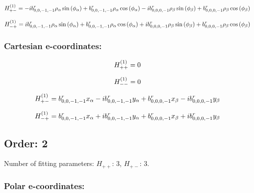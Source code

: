 \documentclass[fleqn]{article}
\begin{document}
\begin{dmath*}
H_{+-}^{(1)}=-  i b^{r}_{0,0,-1,-1} \rho_{\alpha} \sin{\left (\phi_{\alpha} \right )} + b^{r}_{0,0,-1,-1} \rho_{\alpha} \cos{\left (\phi_{\alpha} \right )} -  i b^{r}_{0,0,0,-1} \rho_{\beta} \sin{\left (\phi_{\beta} \right )} + b^{r}_{0,0,0,-1} \rho_{\beta} \cos{\left (\phi_{\beta} \right )}\\
\end{dmath*}

\begin{dmath*}
H_{-+}^{(1)}= i b^{r}_{0,0,-1,-1} \rho_{\alpha} \sin{\left (\phi_{\alpha} \right )} + b^{r}_{0,0,-1,-1} \rho_{\alpha} \cos{\left (\phi_{\alpha} \right )} +  i b^{r}_{0,0,0,-1} \rho_{\beta} \sin{\left (\phi_{\beta} \right )} + b^{r}_{0,0,0,-1} \rho_{\beta} \cos{\left (\phi_{\beta} \right )}\\
\end{dmath*}
\subsubsection*{Cartesian e-coordinates:}

\begin{dmath*}
H_{++}^{(1)}=0\\
\end{dmath*}

\begin{dmath*}
H_{--}^{(1)}=0\\
\end{dmath*}

\begin{dmath*}
H_{+-}^{(1)}=b^{r}_{0,0,-1,-1} x_{\alpha} -  i b^{r}_{0,0,-1,-1} y_{\alpha} + b^{r}_{0,0,0,-1} x_{\beta} -  i b^{r}_{0,0,0,-1} y_{\beta}\\
\end{dmath*}

\begin{dmath*}
H_{-+}^{(1)}=b^{r}_{0,0,-1,-1} x_{\alpha} +  i b^{r}_{0,0,-1,-1} y_{\alpha} + b^{r}_{0,0,0,-1} x_{\beta} +  i b^{r}_{0,0,0,-1} y_{\beta}\\
\end{dmath*}
\subsection{Order: 2}
Number of fitting parameters: $H_{++}$: $3$, $H_{+-}$: $3$.
\subsubsection*{Polar e-coordinates:}
\end{document}
